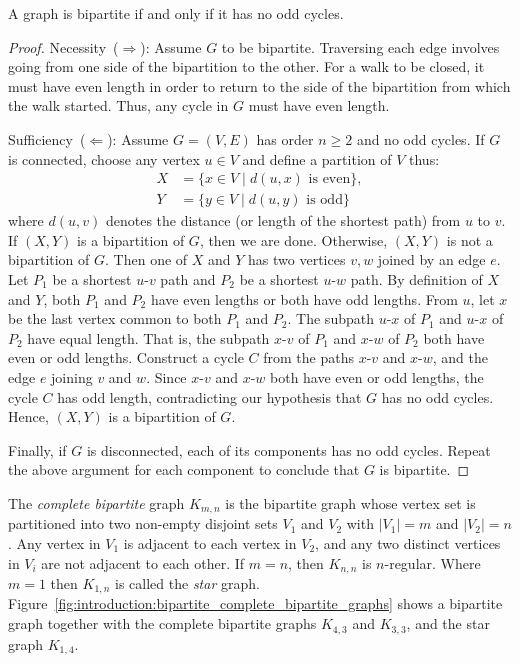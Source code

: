\begin{theorem}
A graph is bipartite if and only if it has no odd cycles.
\end{theorem}

\begin{proof}
Necessity~($\Longrightarrow$): Assume $G$ to be bipartite. Traversing
each edge involves going from one side of the bipartition to the
other. For a walk to be closed, it must have even length in order to
return to the side of the bipartition from which the walk
started. Thus, any cycle in $G$ must have even length.

Sufficiency~($\Longleftarrow$): Assume $G = (V, E)$ has order
$n \geq 2$ and no odd cycles. If $G$ is connected, choose any vertex
$u \in V$ and define a partition of $V$ thus:
%
\begin{align*}
X &= \{x \in V \;|\; d(u,x) \text{ is even}\}, \\
Y &= \{y \in V \;|\; d(u,y) \text{ is odd}\}
\end{align*}
%
where $d(u,v)$ denotes the distance (or length of the shortest path)
from $u$ to $v$. If $(X, Y)$ is a bipartition of $G$, then we are
done. Otherwise, $(X, Y)$ is not a bipartition of $G$. Then one of $X$
and $Y$ has two vertices $v,w$ joined by an edge $e$. Let $P_1$ be a
shortest $u$-$v$ path and $P_2$ be a shortest $u$-$w$ path. By
definition of $X$ and $Y$, both $P_1$ and $P_2$ have even lengths or
both have odd lengths. From $u$, let $x$ be the last vertex common to
both $P_1$ and $P_2$. The subpath $u$-$x$ of $P_1$ and $u$-$x$ of
$P_2$ have equal length. That is, the subpath $x$-$v$ of $P_1$ and
$x$-$w$ of $P_2$ both have even or odd lengths. Construct a cycle $C$
from the paths $x$-$v$ and $x$-$w$, and the edge $e$ joining $v$ and
$w$. Since $x$-$v$ and $x$-$w$ both have even or odd lengths, the
cycle $C$ has odd length, contradicting our hypothesis that $G$ has no
odd cycles. Hence, $(X,Y)$ is a bipartition of $G$.

Finally, if $G$ is disconnected, each of its components has no odd
cycles. Repeat the above argument for each component to conclude that
$G$ is bipartite.
\end{proof}

The \emph{complete bipartite} graph $K_{m,n}$ is the bipartite graph
whose vertex set is partitioned into two non-empty disjoint sets $V_1$
and $V_2$ with $|V_1| = m$ and $|V_2| = n$. Any vertex in $V_1$ is
adjacent to each vertex in $V_2$, and any two distinct vertices in
$V_i$ are not adjacent to each other. If $m = n$, then $K_{n,n}$ is
$n$-regular. Where $m = 1$ then $K_{1,n}$ is called the \emph{star}
graph. Figure~\ref{fig:introduction:bipartite_complete_bipartite_graphs}
shows a bipartite graph together with the complete bipartite graphs
$K_{4,3}$ and $K_{3,3}$, and the star graph $K_{1,4}$.

